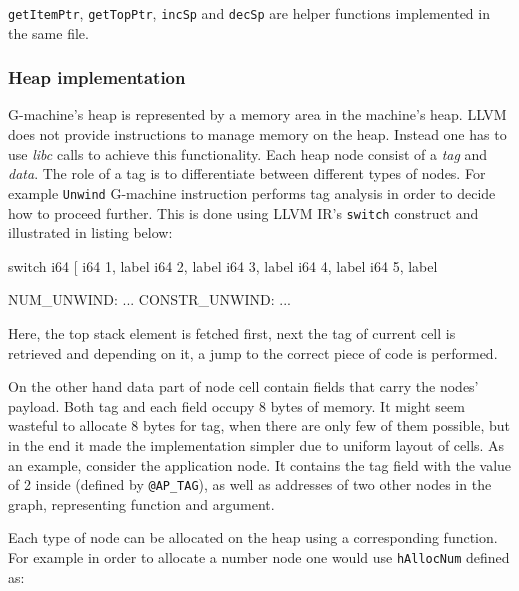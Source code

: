 \documentclass[12pt,a4paper]{report}
\begin{document}
\texttt{getItemPtr}, \texttt{getTopPtr}, \texttt{incSp} and \texttt{decSp} are
helper functions implemented in the same file.


\subsubsection{Heap implementation}
G-machine's heap is represented by a memory area in the machine's heap. LLVM
does not provide instructions to manage memory on the heap. Instead one has to
use \textit{libc} calls to achieve this functionality. Each heap node consist
of a \textit{tag} and \textit{data}. The role of a tag is to differentiate
between different types of nodes. For example \texttt{Unwind} G-machine
instruction performs tag analysis in order to decide how to proceed further.
This is done using LLVM IR's \texttt{switch} construct and illustrated in
listing below:

\vspace*{0.2in}
\begin{code}[style=assembler]

switch i64 %
    [ i64 1, label %
      i64 2, label %
      i64 3, label %
      i64 4, label %
      i64 5, label %

NUM_UNWIND:
...
CONSTR_UNWIND:
...
\end{code}

Here, the top stack element is fetched first, next the tag of current cell is
retrieved and depending on it, a jump to the correct piece of code is
performed.

On the other hand data part of node cell contain fields that carry the nodes'
payload. Both tag and each field occupy 8 bytes of memory. It might seem
wasteful to allocate 8 bytes for tag, when there are only few of them possible,
but in the end it made the implementation simpler due to uniform layout of
cells. As an example, consider the application node. It contains the tag
field with the value of 2 inside (defined by \texttt{@AP\_TAG}), as well as
addresses of two other nodes in the graph, representing function and argument.

Each type of node can be allocated on the heap using a corresponding function.
For example in order to allocate a number node one would use \texttt{hAllocNum}
defined as:

\vspace*{0.2in}
\end{document}
